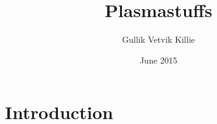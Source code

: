 \documentclass[x11names,twoside,english]{uiofysmaster}
\author{Gullik Vetvik Killie}
\title{Plasmastuffs}
\date{June 2015}
\begin{document}
% 
% 
% 

\chapter{Introduction}
    



%   
%   
\end{document}
